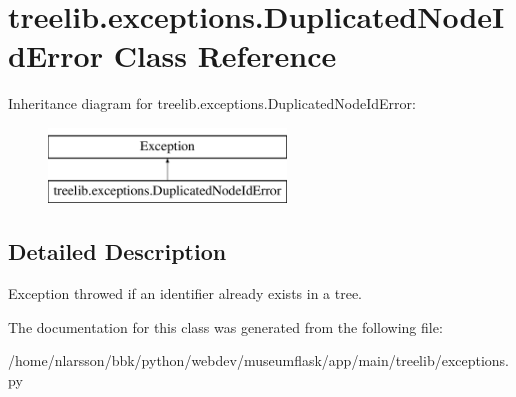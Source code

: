 \hypertarget{classtreelib_1_1exceptions_1_1DuplicatedNodeIdError}{}\section{treelib.\+exceptions.\+Duplicated\+Node\+Id\+Error Class Reference}
\label{classtreelib_1_1exceptions_1_1DuplicatedNodeIdError}
Inheritance diagram for treelib.\+exceptions.\+Duplicated\+Node\+Id\+Error\+:\begin{figure}[H]
\begin{center}
\leavevmode
\includegraphics[height=2.000000cm]{classtreelib_1_1exceptions_1_1DuplicatedNodeIdError}
\end{center}
\end{figure}


\subsection{Detailed Description}
\begin{DoxyVerb}Exception throwed if an identifier already exists in a tree.\end{DoxyVerb}
 

The documentation for this class was generated from the following file\+:\begin{DoxyCompactItemize}
\item 
/home/nlarsson/bbk/python/webdev/museumflask/app/main/treelib/exceptions.\+py\end{DoxyCompactItemize}
